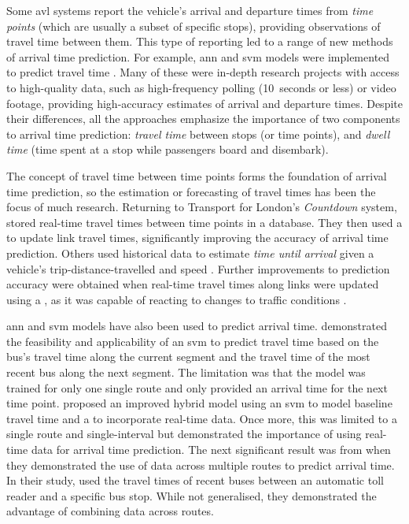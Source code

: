 Some \gls{avl} systems report the vehicle's arrival and departure times from \emph{time points} (which are usually a subset of specific stops), providing observations of travel time between them. This type of reporting led to a range of new methods of arrival time prediction. For example, \gls{ann} and \gls{svm} models were implemented to predict travel time \citep{Jeong_2005,Shalaby_2004,Yu_2011,Cats_2015,Cats_2016,Yin_2017}. Many of these were in-depth research projects with access to high-quality data, such as high-frequency polling (10~seconds or less) or video footage, providing high-accuracy estimates of arrival and departure times. Despite their differences, all the approaches emphasize the importance of two components to arrival time prediction: \emph{travel time} between stops (or time points), and \emph{dwell time} (time spent at a stop while passengers board and disembark).


The concept of travel time between time points forms the foundation of arrival time prediction, so the estimation or forecasting of travel times has been the focus of much research. Returning to Transport for London's \emph{Countdown} system, \citet{Reinhoudt_1997} stored real-time travel times between time points in a database. They then used a \kf{} to update link travel times, significantly improving the accuracy of arrival time prediction. Others used historical data to estimate \emph{time until arrival} given a vehicle's trip-distance-travelled and speed \citep{Wall_1999,Dailey_2001,Cathey_2003}. Further improvements to prediction accuracy were obtained when real-time travel times along links were updated using a \kf{}, as it was capable of reacting to changes to traffic conditions \citep{Shalaby_2004}.


\Gls{ann} and \gls{svm} models have also been used to predict arrival time.  demonstrated the feasibility and applicability of an \gls{svm} to predict travel time based on the bus's travel time along the current segment and the travel time of the most recent bus along the next segment. The limitation was that the model was trained for only one single route and only provided an arrival time for the next time point. \citet{Yu_2010} proposed an improved hybrid model using an \gls{svm} to model baseline travel time and a \kf{} to incorporate real-time data. Once more, this was limited to a single route and single-interval but demonstrated the importance of using real-time data for arrival time prediction. The next significant result was from \citet{Yu_2011} when they demonstrated the use of data across multiple routes to predict arrival time. In their study, \citeauthor{Yu_2011} used the travel times of recent buses between an automatic toll reader and a specific bus stop. While not generalised, they demonstrated the advantage of combining data across routes.


